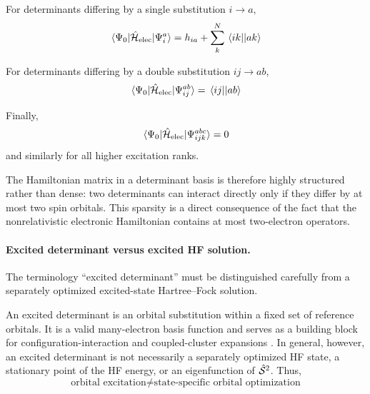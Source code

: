 \documentclass[11pt,a4paper,titlepage]{article}
\numberwithin{equation}{section}
\newcommand{\chH}{\Hat{\mathcal{H}}}
\newcommand{\chS}{\Hat{\mathcal{S}}}
\begin{document}
For determinants differing by a single substitution $i\rightarrow a$,
\begin{equation}
  \mel*{\Psi_0}{\chH_\text{elec}}{\Psi_i^a}
  =
  h_{ia}
  +
  \sum_{k}^{N}
  \mel{ik}{}{ak}
  \label{eq:sc-h-single}
\end{equation}

For determinants differing by a double substitution $ij\rightarrow ab$,
\begin{equation}
  \mel*{\Psi_0}{\chH_\text{elec}}{\Psi_{ij}^{ab}}
  =
  \mel{ij}{}{ab}
  \label{eq:sc-h-double}
\end{equation}

Finally,
\begin{equation}
  \mel*{\Psi_0}{\chH_\text{elec}}{\Psi_{ijk}^{abc}}
  =
  0
\end{equation}
and similarly for all higher excitation ranks.

The Hamiltonian matrix in a determinant basis is therefore highly
structured rather than dense: two determinants can interact directly only
if they differ by at most two spin orbitals. This sparsity is a direct
consequence of the fact that the nonrelativistic electronic Hamiltonian
contains at most two-electron operators.


\paragraph{Excited determinant versus excited HF solution.}

The terminology ``excited determinant'' must be distinguished carefully from
a separately optimized excited-state Hartree--Fock solution.

An excited determinant is an orbital substitution within a fixed set of
reference orbitals. It is a valid many-electron basis function and serves as a
building block for configuration-interaction and coupled-cluster expansions
\citep{Shavitt1998,BartlettMusial2007}.
In general, however, an excited determinant is not necessarily a separately
optimized HF state, a stationary point of the HF energy, or an eigenfunction
of $\chS^2$.
Thus,
\begin{equation}
  \boxed{
  \text{orbital excitation}
  \neq
  \text{state-specific orbital optimization}
  }
\end{equation}
\end{document}
